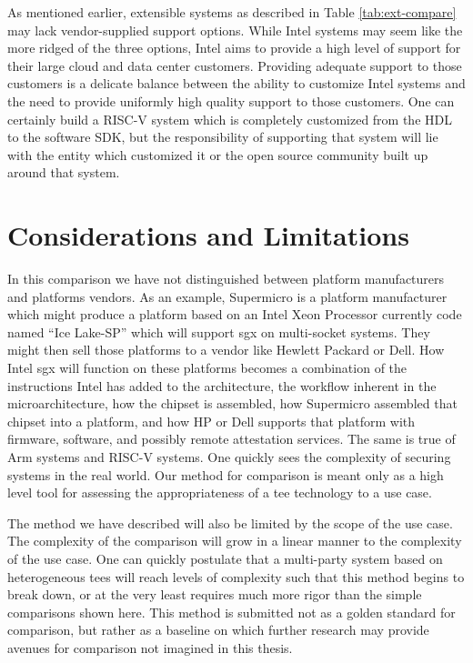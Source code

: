 As mentioned earlier, extensible systems as described in Table \ref{tab:ext-compare} may lack vendor-supplied support options. While Intel systems may seem like the more ridged of the three options, Intel aims to provide a high level of support for their large cloud and data center customers. Providing adequate support to those customers is a delicate balance between the ability to customize Intel systems and the need to provide uniformly high quality support to those customers. One can certainly build a RISC-V system which is completely customized from the HDL to the software SDK, but the responsibility of supporting that system will lie with the entity which customized it or the open source community built up around that system.

\renewcommand{\arraystretch}{1}


\section{Considerations and Limitations}

In this comparison we have not distinguished between platform manufacturers and platforms vendors. As an example, Supermicro is a platform manufacturer which might produce a platform based on an Intel Xeon Processor currently code named ``Ice Lake-SP'' which will support \gls{sgx} on multi-socket systems. They might then sell those platforms to a vendor like Hewlett Packard or Dell. How Intel \gls{sgx} will function on these platforms becomes a combination of the instructions Intel has added to the architecture, the workflow inherent in the microarchitecture, how the chipset is assembled, how Supermicro assembled that chipset into a platform, and how HP or Dell supports that platform with firmware, software, and possibly remote \gls{attestation} services. The same is true of Arm systems and RISC-V systems. One quickly sees the complexity of securing systems in the real world. Our method for comparison is meant only as a high level tool for assessing the appropriateness of a \gls{tee} technology to a use case.

The method we have described will also be limited by the scope of the use case. The complexity of the comparison will grow in a linear manner to the complexity of the use case. One can quickly postulate that a multi-party system based on heterogeneous \glspl{tee} will reach levels of complexity such that this method begins to break down, or at the very least requires much more rigor than the simple comparisons shown here. This method is submitted not as a golden standard for comparison, but rather as a baseline on which further research may provide avenues for comparison not imagined in this thesis.